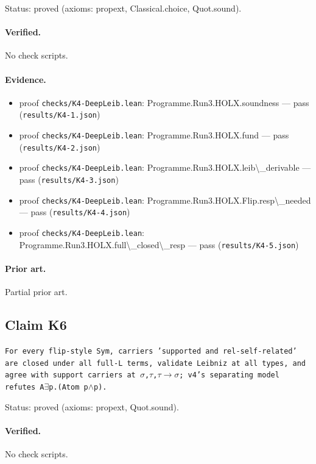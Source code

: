 \documentclass{article}
\begin{document}
Status: proved (axioms: propext, Classical.choice, Quot.sound).

\paragraph{Verified.}
No check scripts.

\paragraph{Evidence.}
\begin{itemize}
\item proof \texttt{checks/K4-DeepLeib.lean}: Programme.Run3.HOLX.soundness --- pass (\texttt{results/K4-1.json})
\item proof \texttt{checks/K4-DeepLeib.lean}: Programme.Run3.HOLX.fund --- pass (\texttt{results/K4-2.json})
\item proof \texttt{checks/K4-DeepLeib.lean}: Programme.Run3.HOLX.leib\textbackslash{}\_derivable --- pass (\texttt{results/K4-3.json})
\item proof \texttt{checks/K4-DeepLeib.lean}: Programme.Run3.HOLX.Flip.resp\textbackslash{}\_needed --- pass (\texttt{results/K4-4.json})
\item proof \texttt{checks/K4-DeepLeib.lean}: Programme.Run3.HOLX.full\textbackslash{}\_closed\textbackslash{}\_resp --- pass (\texttt{results/K4-5.json})
\end{itemize}

\paragraph{Prior art.} Partial prior art.

\subsection*{Claim K6}

\texttt{For every flip-style Sym, carriers 'supported and rel-self-related' are closed under all full-L terms, validate Leibniz at all types, and agree with support carriers at $\sigma$,$\tau$,$\tau$$\to$$\sigma$; v4's separating model refutes A$\exists$p.(Atom p$\wedge$p).}

Status: proved (axioms: propext, Quot.sound).

\paragraph{Verified.}
No check scripts.
\end{document}
